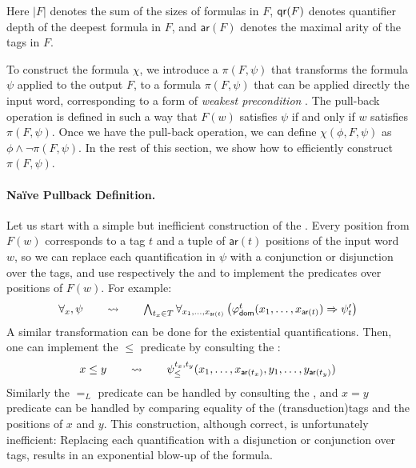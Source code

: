 Here $|F|$ denotes the sum of the sizes of formulas in $F$,
$\mathop{\mathsf{qr}}(F)$ denotes quantifier depth of the deepest formula in $F$, 
and $\textsf{ar}(F)$ denotes the maximal arity of the tags in $F$.


To construct the formula $\chi$, we introduce a 
$\pi(F, \psi)$ that transforms the formula $\psi$ applied to the output $F$, to
a formula $\pi(F, \psi)$ that can be applied directly the input word,
corresponding to a form of \emph{weakest precondition} \cite[Chapter
7]{WINSKEL93}. The pull-back operation is defined in such a way that $F(w)$
satisfies $\psi$ if and only if $w$ satisfies $\pi(F, \psi)$. Once we have the
pull-back operation, we can define $\chi(\phi, F, \psi)$ as $\phi \wedge \neg
\pi(F, \psi)$. In the rest of this section, we show how to efficiently
construct $\pi(F, \psi)$.

\paragraph{Naïve Pullback Definition.} Let us start 
with a simple but inefficient construction of the .
Every position from $F(w)$ corresponds to a tag $t$ and a tuple of $\mathsf{ar}(t)$ positions of the input word $w$, 
so we can replace each quantification in $\psi$ with a conjunction or disjunction
over the tags,
and use respectively the 
and  to implement the
predicates over positions of $F(w)$.
For example: 
\[ 
\begin{tabular}{ccc}
    $\forall_{x}, \psi$ & $\quad \rightsquigarrow \quad$ & $\bigwedge_{t_x \in T} \forall_{x_1, \ldots, x_{\mathsf{ar}(t)}} \left( \varphi_{\mathsf{dom}}^t(x_1, \ldots, x_{\mathsf{ar}(t)}) \Rightarrow \psi'_{t} \right)$
\end{tabular}
\]
A similar transformation can be done for the existential
quantifications. Then, one can
implement the $\leq$ predicate by consulting the :
\[
\begin{tabular}{ccc}
    $x \leq y$ & $\quad \rightsquigarrow \quad$ & $\psi_{\leq}^{t_x, t_y}(x_1, \ldots, x_{\mathsf{ar}(t_x)}, y_1, \ldots, y_{\mathsf{ar}(t_y)})$
\end{tabular}
\]
Similarly the $=_L$ predicate can be handled by consulting the , and
$x = y$ predicate can be handled by comparing equality of the \kl(transduction){tags}
and the positions of $x$ and $y$. This construction, although correct, is unfortunately inefficient:  Replacing each quantification with a disjunction or conjunction
over tags, results in an exponential blow-up of the formula. 

